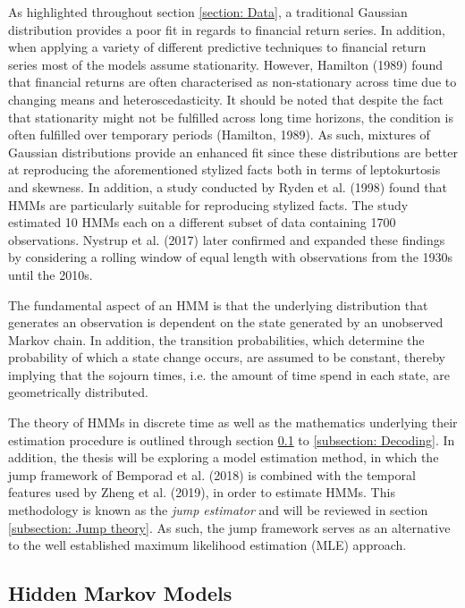  
As highlighted throughout section \ref{section: Data}, a traditional Gaussian distribution provides a poor fit in regards to financial return series. In addition, when applying a variety of different predictive techniques to financial return series most of the models assume stationarity. However, Hamilton (1989) found that financial returns are often characterised as non-stationary across time due to changing means and heteroscedasticity. It should be noted that despite the fact that stationarity might not be fulfilled across long time horizons, the condition is often fulfilled over temporary periods (Hamilton, 1989). As such, mixtures of Gaussian distributions provide an enhanced fit since these distributions are better at reproducing the aforementioned stylized facts both in terms of leptokurtosis and skewness. In addition, a study conducted by Ryden et al. (1998) found that HMMs are particularly suitable for reproducing stylized facts. The study estimated 10 HMMs each on a different subset of data containing 1700 observations. Nystrup et al. (2017) later confirmed and expanded these findings by considering a rolling window of equal length with observations from the 1930s until the 2010s.

The fundamental aspect of an HMM is that the underlying distribution that generates an observation is dependent on the state generated by an unobserved Markov chain. In addition, the transition probabilities, which determine the probability of which a state change occurs, are assumed to be constant, thereby implying that the sojourn times, i.e. the amount of time spend in each state, are geometrically distributed.

The theory of HMMs in discrete time as well as the mathematics underlying their estimation procedure is outlined through section \ref{subsection: HMM} to \ref{subsection: Decoding}. In addition, the thesis will be exploring a model estimation method, in which the jump framework of Bemporad et al. (2018) is combined with the temporal features used by Zheng et al. (2019), in order to estimate HMMs. This methodology is known as the \textit{jump estimator} and will be reviewed in section \ref{subsection: Jump theory}. As such, the jump framework serves as an alternative to the well established maximum likelihood estimation (MLE) approach. 


\subsection{Hidden Markov Models}
\label{subsection: HMM}

